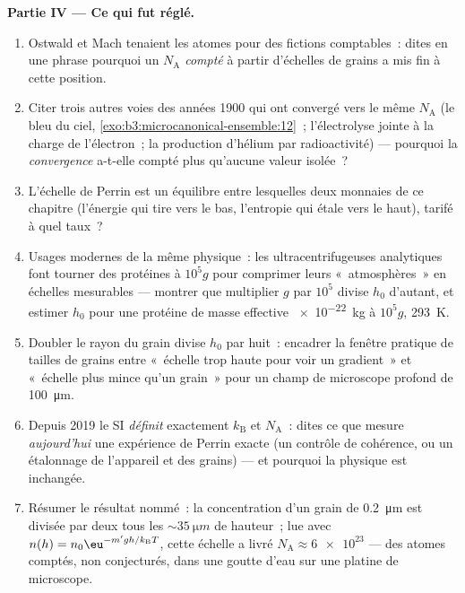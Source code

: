 \begin{problem}
\medskip\noindent\textbf{Partie IV --- Ce qui fut réglé.}
\begin{enumerate}[resume]
  \item Ostwald et Mach tenaient les atomes pour des fictions
        comptables~: dites en une phrase pourquoi un $N_{\text{A}}$
        \emph{compté} à partir d'échelles de grains a mis fin à cette
        position.
  \item Citer trois autres voies des années 1900 qui ont convergé
        vers le même $N_{\text{A}}$ (le bleu du ciel,
        \cref{exo:b3:microcanonical-ensemble:12}~; l'électrolyse
        jointe à la charge de l'électron~; la production d'hélium par
        radioactivité) --- pourquoi la \emph{convergence} a-t-elle
        compté plus qu'aucune valeur isolée~?
  \item L'échelle de Perrin est un équilibre entre lesquelles deux
        monnaies de ce chapitre (l'énergie qui tire vers le bas,
        l'entropie qui étale vers le haut), tarifé à quel taux~?
  \item Usages modernes de la même physique~: les
        ultracentrifugeuses analytiques font tourner des protéines à
        $10^5g$ pour comprimer leurs «~atmosphères~» en échelles
        mesurables --- montrer que multiplier $g$ par $10^5$ divise
        $h_0$ d'autant, et estimer $h_0$ pour une protéine de masse
        effective \qty{e-22}{kg} à $10^5g$, \qty{293}{K}.
  \item Doubler le rayon du grain divise $h_0$ par huit~: encadrer la
        fenêtre pratique de tailles de grains entre «~échelle trop
        haute pour voir un gradient~» et «~échelle plus mince qu'un
        grain~» pour un champ de microscope profond de
        \qty{100}{\micro m}.
  \item Depuis 2019 le SI \emph{définit} exactement $k_{\text{B}}$ et
        $N_{\text{A}}$~: dites ce que mesure \emph{aujourd'hui} une
        expérience de Perrin exacte (un contrôle de cohérence, ou un
        étalonnage de l'appareil et des grains) --- et pourquoi la
        physique est inchangée.
  \item Résumer le résultat nommé~: la concentration d'un grain de
        \qty{0.2}{\micro m} est divisée par deux tous les
        $\sim\qty{35}{\micro m}$ de hauteur~; lue avec
        $n(h) = n_0\eu^{-m'gh/k_{\text{B}}T}$, cette échelle a livré
        $N_{\text{A}} \approx \num{6e23}$ --- des atomes comptés, non
        conjecturés, dans une goutte d'eau sur une platine de
        microscope.
\end{enumerate}
\end{problem}
